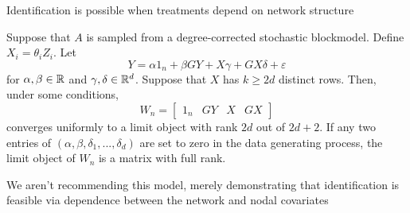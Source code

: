 \documentclass[aspectratio=169]{beamer}
\theoremstyle{remark}
\begin{document}
\begin{frame}{Identification is possible when treatments depend on network structure}
    \begin{theorem}
        Suppose that $A$ is sampled from a degree-corrected stochastic blockmodel. Define $X_i = \theta_i Z_i$. Let 
        \begin{equation*}
            Y = \alpha 1_n + \beta G Y + X \gamma + G X \delta + \varepsilon
        \end{equation*}
        for $\alpha, \beta \in \mathbb{R}$ and $\gamma, \delta \in \mathbb{R}^d$. Suppose that $X$ has $k \ge 2d$ distinct rows. Then, under some conditions,
        \begin{equation*}
            W_n = \begin{bmatrix}
                1_n & GY & X & GX
            \end{bmatrix}
        \end{equation*}
        converges uniformly to a limit object with rank $2d$ out of $2d + 2$. If any two entries of $(\alpha, \beta, \delta_1, ..., \delta_d)$ are set to zero in the data generating process, the limit object of $W_n$ is a matrix with full rank.
    \end{theorem}
    \vspace{4mm}
    \footnotesize * We aren't recommending this model, merely demonstrating that identification is feasible via dependence between the network and nodal covariates
\end{frame}



\end{document}
